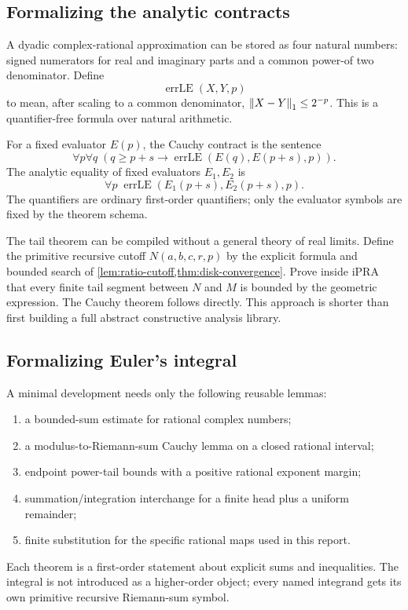 \subsection{Formalizing the analytic contracts}

A dyadic complex-rational approximation can be stored as four natural
numbers: signed numerators for real and imaginary parts and a common power-of
two denominator.  Define
\[
 \operatorname{errLE}(X,Y,p)
\]
to mean, after scaling to a common denominator,
\(\left\lVert X-Y\right\rVert_1\le2^{-p}\).  This is a quantifier-free formula over natural
arithmetic.

For a fixed evaluator \(E(p)\), the Cauchy contract is the sentence
\[
 \forall p\forall q\;
 (q\ge p+s\to\operatorname{errLE}(E(q),E(p+s),p)).
\]
The analytic equality of fixed evaluators \(E_1,E_2\) is
\[
 \forall p\;
 \operatorname{errLE}(E_1(p+s),E_2(p+s),p).
\]
The quantifiers are ordinary first-order quantifiers; only the evaluator
symbols are fixed by the theorem schema.

The tail theorem can be compiled without a general theory of real limits.
Define the primitive recursive cutoff \(N(a,b,c,r,p)\) by the explicit formula
and bounded search of \cref{lem:ratio-cutoff,thm:disk-convergence}.  Prove
inside iPRA that every finite tail segment between \(N\) and \(M\) is bounded
by the geometric expression.  The Cauchy theorem follows directly.  This
approach is shorter than first building a full abstract constructive analysis
library.

\subsection{Formalizing Euler's integral}

A minimal development needs only the following reusable lemmas:
\begin{enumerate}
\item a bounded-sum estimate for rational complex numbers;
\item a modulus-to-Riemann-sum Cauchy lemma on a closed rational interval;
\item endpoint power-tail bounds with a positive rational exponent margin;
\item summation/integration interchange for a finite head plus a uniform
remainder;
\item finite substitution for the specific rational maps used in this report.
\end{enumerate}
Each theorem is a first-order statement about explicit sums and inequalities.
The integral is not introduced as a higher-order object; every named integrand
gets its own primitive recursive Riemann-sum symbol.

